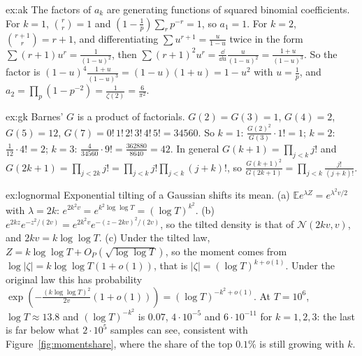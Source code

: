 \begin{solution}{ex:ak}
\idea The factors of $a_k$ are generating functions of squared binomial coefficients.
\writeup For $k=1$, $\binom r r=1$ and $(1-\frac1p)\sum_rp^{-r}=1$, so $a_1=1$. For $k=2$, $\binom{r+1}r=r+1$, and differentiating $\sum u^{r+1}=\frac u{1-u}$ twice in the form $\sum(r+1)u^r=\frac1{(1-u)^2}$, then $\sum(r+1)^2u^r=\frac{\dd}{\dd u}\frac u{(1-u)^2}=\frac{1+u}{(1-u)^3}$. So the factor is $(1-u)^4\frac{1+u}{(1-u)^3}=(1-u)(1+u)=1-u^2$ with $u=\frac1p$, and $a_2=\prod_p(1-p^{-2})=\frac1{\zeta(2)}=\frac6{\pi^2}$.
\end{solution}

\begin{solution}{ex:gk}
\idea Barnes' $G$ is a product of factorials.
\writeup $G(2)=G(3)=1$, $G(4)=2$, $G(5)=12$, $G(7)=0!\,1!\,2!\,3!\,4!\,5!=34560$. So $k=1$: $\frac{G(2)^2}{G(3)}\cdot1!=1$; $k=2$: $\frac1{12}\cdot4!=2$; $k=3$: $\frac4{34560}\cdot9!=\frac{362880}{8640}=42$. In general $G(k+1)=\prod_{j<k}j!$ and $G(2k+1)=\prod_{j<2k}j!=\prod_{j<k}j!\prod_{j<k}(j+k)!$, so $\frac{G(k+1)^2}{G(2k+1)}=\prod_{j<k}\frac{j!}{(j+k)!}$.
\end{solution}

\begin{solution}{ex:lognormal}
\idea Exponential tilting of a Gaussian shifts its mean.
\writeup (a) $\mathbb Ee^{\lambda Z}=e^{\lambda^2v/2}$ with $\lambda=2k$: $e^{2k^2v}=e^{k^2\log\log T}=(\log T)^{k^2}$. (b) $e^{2kz}e^{-z^2/(2v)}=e^{2k^2v}e^{-(z-2kv)^2/(2v)}$, so the tilted density is that of $\mathcal N(2kv,v)$, and $2kv=k\log\log T$. (c) Under the tilted law, $Z=k\log\log T+O_P(\sqrt{\log\log T})$, so the moment comes from $\log|\zeta|=k\log\log T(1+o(1))$, that is $|\zeta|=(\log T)^{k+o(1)}$. Under the original law this has probability $\exp(-\frac{(k\log\log T)^2}{2v}(1+o(1)))=(\log T)^{-k^2+o(1)}$. At $T=10^6$, $\log T\approx13.8$ and $(\log T)^{-k^2}$ is $0.07$, $4\cdot10^{-5}$ and $6\cdot10^{-11}$ for $k=1,2,3$: the last is far below what $2\cdot10^5$ samples can see, consistent with Figure~\ref{fig:momentshare}, where the share of the top $0.1\%$ is still growing with $k$.
\end{solution}

